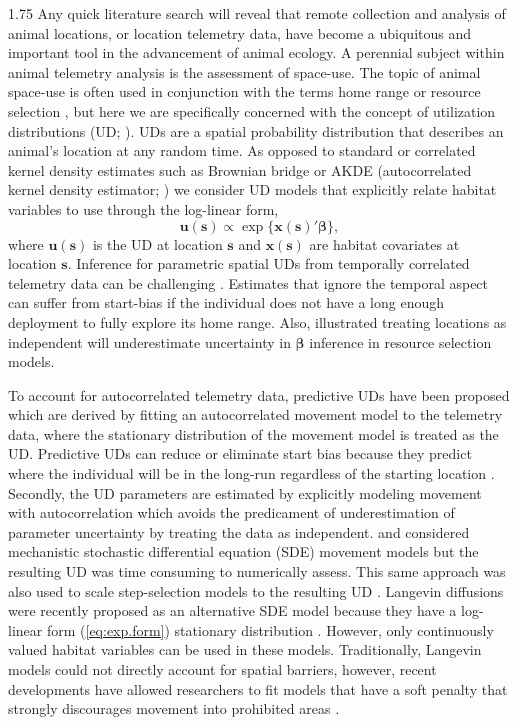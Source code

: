 \documentclass[12pt]{article}
\newcommand{\bx}{\ensuremath{\mathbf{x}}}
\newcommand{\bu}{\ensuremath{\mathbf{u}}}
\newcommand{\bs}{\ensuremath{\mathbf{s}}}
\newcommand{\bb}{\ensuremath{\boldsymbol{\beta}}}
\begin{document}
\begin{spacing}{1.75}
Any quick literature search will reveal that remote collection and analysis of animal locations, or location telemetry data, have become a ubiquitous and important tool in the advancement of animal ecology. A perennial subject within animal telemetry analysis is the assessment of space-use. The topic of animal space-use is often used in conjunction with the terms home range \citep{Burt1943a} or resource selection \citep{Johnson:1980kh}, but here we are specifically concerned with the concept of utilization distributions (UD; \citealt{powell2012home}).  UDs are a spatial probability distribution that describes an animal's location at any random time. As opposed to standard \citep{Keating:2009hl} or correlated kernel density estimates such as Brownian bridge \citep{Horne:2007mw} or AKDE (autocorrelated kernel density estimator; \citealt{fleming2015rigorous,calabrese2016ctmm}) we consider UD models that explicitly relate habitat variables to use through the log-linear form, 
\begin{equation}
\label{eq:exp.form}
\bu(\bs) \propto \exp\{\bx(\bs)'\bb\},
\end{equation} 
where $\bu(\bs)$ is the UD at location $\bs$ and $\bx(\bs)$ are habitat covariates at location $\bs$. Inference for parametric spatial UDs from temporally correlated telemetry data can be challenging \citep{Johnson:2013fk}. Estimates that ignore the temporal aspect can suffer from start-bias \citep{whitehead2013inferring, calabrese2016ctmm} if the individual does not have a long enough deployment to fully explore its home range. Also, \citep{Alston:2023aa} illustrated treating locations as independent will underestimate uncertainty in $\bb$ inference in resource selection models.  

To account for autocorrelated telemetry data, predictive UDs have been proposed which are derived by fitting an autocorrelated movement model to the telemetry data, where the stationary distribution of the movement model is treated as the UD. Predictive UDs can reduce or eliminate start bias because they predict where the individual will be in the long-run regardless of the starting location \citep{whitehead2013inferring}. Secondly, the UD parameters are estimated by explicitly modeling movement with autocorrelation which avoids the predicament of underestimation of parameter uncertainty by treating the data as independent. \cite{Barnett:2008wj} and \cite{moorcroft1999home} considered mechanistic stochastic differential equation (SDE) movement models but the resulting UD was time consuming to numerically assess. This same approach was also used to scale step-selection models to the resulting UD \citep{PottsBorger2023a}. Langevin diffusions were recently proposed as an alternative SDE model because they have a log-linear form (\ref{eq:exp.form}) stationary distribution \citep{michelot2018langevin,DupontEtAl2026a}. However, only continuously valued habitat variables can be used in these models. Traditionally, Langevin models could not directly account for spatial barriers, however, recent developments have allowed researchers to fit models that have a soft penalty that strongly discourages movement into prohibited areas \citep{DupontEtAl2026a, DelporteEtAl2026a}. 


\end{spacing}
\end{document}
